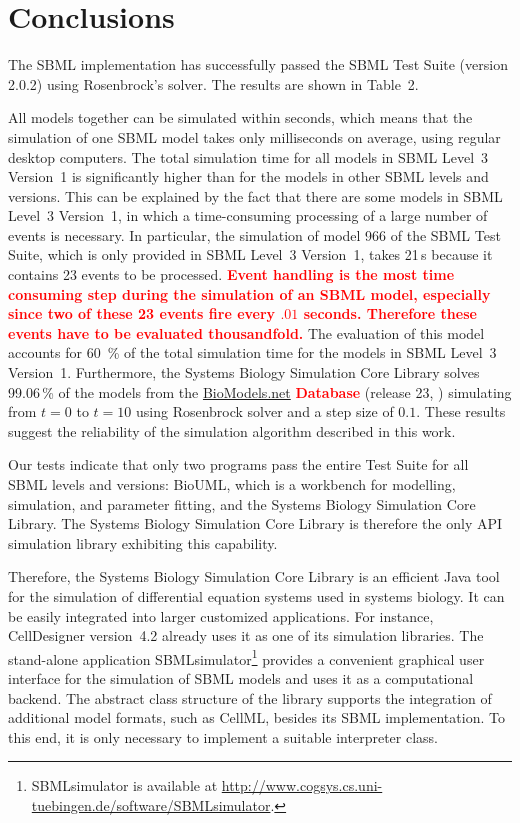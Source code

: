 \documentclass[10pt]{bmc_article}
\newenvironment{bmcformat}{\baselineskip20pt\sloppy\setboolean{publ}{false}}{\baselineskip20pt\sloppy}
\newcommand{\TODO}[1]{\textcolor{red}{\textbf{#1}}}
\begin{document}
\begin{bmcformat}
\section*{Conclusions}
The SBML implementation has successfully passed the
SBML Test Suite (version 2.0.2) using Rosenbrock's solver.
The results are shown in Table~2.

All models together can be simulated within seconds, which means that the simulation
of one SBML model takes only milliseconds on average, using regular desktop computers.
The total simulation time for all models in SBML Level~3 Version~1 is significantly
higher than for the models in other SBML levels and versions.
This can be explained by the fact that there are some models in SBML Level~3
Version~1, in which a time-consuming processing of a large number of events is
necessary.
In particular, the simulation of model 966 of the SBML Test Suite, which is only provided in SBML Level~3 Version~1, takes 21\,s because it contains 23 events to be processed. \TODO{Event handling is the most time consuming step during the simulation of an SBML model, especially since two of these 23 events fire every $.01$ seconds.  Therefore these events
have to be evaluated thousandfold.} The evaluation of this model accounts for 60~\% of the total simulation time for the models in SBML Level~3 Version~1. 
Furthermore, the Systems Biology Simulation Core Library solves 99.06\,\% of the
models from the \href{http://biomodels.net}{BioModels.net} \TODO{Database} (release 23,
\cite{Novere2006a}) simulating from $t = 0$ to $t = 10$ using Rosenbrock solver
and a step size of $0.1$.
These results suggest the reliability of the simulation algorithm described in
this work.

Our tests indicate that only two programs pass the entire Test Suite for all 
SBML levels and versions: BioUML, which is a workbench for modelling, simulation,
and parameter fitting, and the Systems Biology Simulation Core Library.
The Systems Biology Simulation Core Library is therefore the only API simulation
library exhibiting this capability.

Therefore, the Systems Biology Simulation Core Library is an efficient Java tool
for the simulation of differential equation systems used in systems biology.
It can be easily integrated into larger customized applications.
For instance, CellDesigner version~4.2 \cite{Funahashi2003} already uses it as
one of its simulation libraries.
The stand-alone application SBMLsimulator\footnote{SBMLsimulator is available at
\url{http://www.cogsys.cs.uni-tuebingen.de/software/SBMLsimulator}.}
provides a convenient graphical user interface for the simulation of SBML
models and uses it as a computational backend.
The abstract class structure of the library supports the integration of
additional model formats, such as CellML, besides its SBML implementation. To
this end, it is only necessary to implement a suitable interpreter class.


\end{bmcformat}
\end{document}
